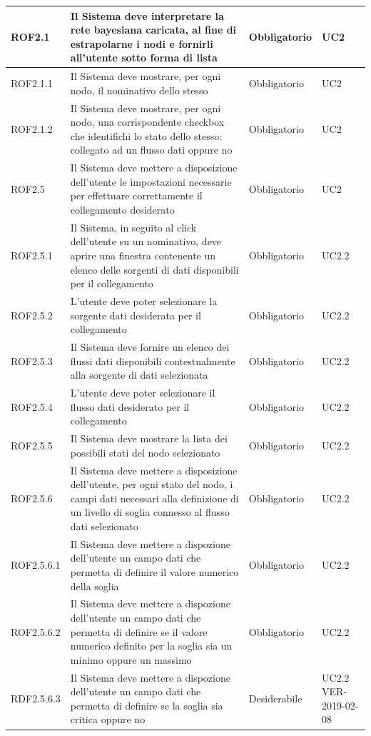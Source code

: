 \begin{center}
\begin{longtable}[c]{|m{}|m{}|m{}|m{}|}
\hline
ROF2.1 & Il Sistema deve interpretare la rete bayesiana caricata, al fine di estrapolarne i nodi e fornirli all'utente sotto forma di lista & Obbligatorio & UC2\\
\hline
\rowcolor{grigio}ROF2.1.1 & Il Sistema deve mostrare, per ogni nodo, il nominativo dello stesso & Obbligatorio & UC2\\
\hline
ROF2.1.2 & Il Sistema deve mostrare, per ogni nodo, una corrispondente checkbox che identifichi lo stato dello stesso: collegato ad un flusso dati oppure no & Obbligatorio & UC2\\
\hline
\rowcolor{grigio}ROF2.5 & Il Sistema deve mettere a disposizione dell'utente le impostazioni necessarie per effettuare correttamente il collegamento desiderato & Obbligatorio & UC2\\
\hline
ROF2.5.1 & Il Sistema, in seguito al click dell'utente su un nominativo, deve aprire una finestra contenente un elenco delle sorgenti di dati disponibili per il collegamento & Obbligatorio & UC2.2\\
\hline
\rowcolor{grigio}ROF2.5.2 & L'utente deve poter selezionare la sorgente dati desiderata per il collegamento & Obbligatorio & UC2.2\\
\hline
ROF2.5.3 & Il Sistema deve fornire un elenco dei flussi dati disponibili contestualmente alla sorgente di dati selezionata & Obbligatorio & UC2.2\\
\hline
\rowcolor{grigio}ROF2.5.4 & L'utente deve poter selezionare il flusso dati desiderato per il collegamento & Obbligatorio & UC2.2\\
\hline
ROF2.5.5 & Il Sistema deve mostrare la lista dei possibili stati del nodo selezionato & Obbligatorio & UC2.2\\
\hline
\rowcolor{grigio}ROF2.5.6 & Il Sistema deve mettere a disposizione dell'utente, per ogni stato del nodo, i campi dati necessari alla definizione di un livello di soglia connesso al flusso dati selezionato & Obbligatorio & UC2.2\\
\hline
ROF2.5.6.1 & Il Sistema deve mettere a dispozione dell'utente un campo dati che permetta di definire il valore numerico della soglia & Obbligatorio & UC2.2\\
\hline
\rowcolor{grigio}ROF2.5.6.2 & Il Sistema deve mettere a dispozione dell'utente un campo dati che permetta di definire se il valore numerico definito per la soglia sia un minimo oppure un massimo & Obbligatorio & UC2.2\\
\hline
RDF2.5.6.3 & Il Sistema deve mettere a dispozione dell'utente un campo dati che permetta di definire se la soglia sia critica oppure no & Desiderabile & UC2.2 VER-2019-02-08\\

\end{longtable}
\end{center}
